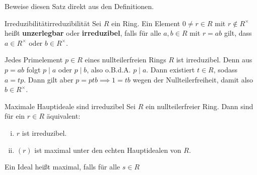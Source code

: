 \begin{übung}
Beweise diesen Satz direkt aus den Definitionen.
\end{übung}
\begin{definition}{Irreduzibilität}{irreduzibilität}
Sei $R$ ein Ring. Ein Element $0 \neq r \in R$ mit $r \notin R^\times$ heißt \textbf{unzerlegbar} oder \textbf{irreduzibel}, falls für alle $a,b \in R$ mit $r=ab$ gilt, dass $a \in R^\times$ oder $b \in R^\times$.
\end{definition}
\begin{beispiel}
Jedes Primelement $p \in R$ eines nullteilerfreien Rings $R$ ist irreduzibel. Denn aus $p = ab$ folgt $p \mid a$ oder $p \mid b$, also o.B.d.A. $p \mid a$. Dann existiert $t \in R$, sodass $a = tp$. Dann gilt aber $p=ptb \implies 1 = tb$ wegen der Nullteilerfreiheit, damit also $b \in R^\times$.
\end{beispiel}
\begin{satz}{Maximale Hauptideale sind irreduzibel}{}
Sei $R$ ein nullteilerfreier Ring. Dann sind für ein $r \in R$ äquivalent:
\begin{enumerate}[(i)]
\item $r$ ist irreduzibel.
\item $(r)$ ist maximal unter den echten Hauptidealen von $R$.
\end{enumerate}
\end{satz}
Ein Ideal heißt maximal, falls für alle $s \in R$